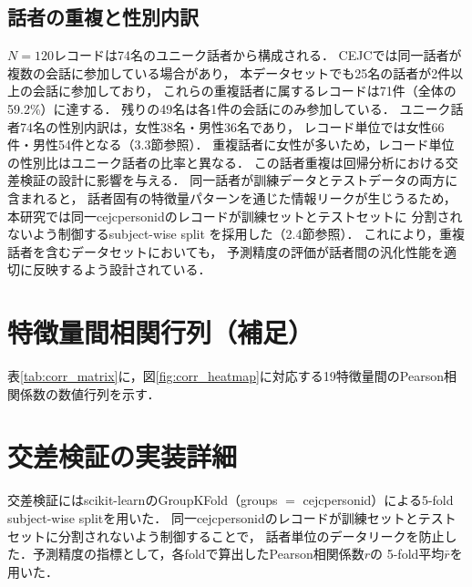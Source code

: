 \documentclass[dvipdfmx,11pt,a4paper]{bxjsarticle}
\renewcommand{\_}{\paperorigunderscore\allowbreak}%
\begin{document}
\subsection{話者の重複と性別内訳}
$N = 120$レコードは74名のユニーク話者から構成される．
CEJCでは同一話者が複数の会話に参加している場合があり，
本データセットでも25名の話者が2件以上の会話に参加しており，
これらの重複話者に属するレコードは71件（全体の59.2\%）に達する．
残りの49名は各1件の会話にのみ参加している．
ユニーク話者74名の性別内訳は，女性38名・男性36名であり，
レコード単位では女性66件・男性54件となる（3.3節参照）．
重複話者に女性が多いため，レコード単位の性別比はユニーク話者の比率と異なる．
この話者重複は回帰分析における交差検証の設計に影響を与える．
同一話者が訓練データとテストデータの両方に含まれると，
話者固有の特徴量パターンを通じた情報リークが生じうるため，
本研究では同一cejc\_person\_idのレコードが訓練セットとテストセットに
分割されないよう制御するsubject-wise split を採用した（2.4節参照）．
これにより，重複話者を含むデータセットにおいても，
予測精度の評価が話者間の汎化性能を適切に反映するよう設計されている．

\section{特徴量間相関行列（補足）}
\label{sec:supp_corr}
表\ref{tab:corr_matrix}に，図\ref{fig:corr_heatmap}に対応する19特徴量間のPearson相関係数の数値行列を示す．

\begin{table}[htbp]
\centering
\caption{19特徴量間のPearson相関行列．}
\label{tab:corr_matrix}

\end{table}

\section{交差検証の実装詳細}
\label{sec:appendix_cv}
交差検証にはscikit-learnのGroupKFold（groups $=$ cejc\_person\_id）による5-fold subject-wise splitを用いた．
同一cejc\_person\_idのレコードが訓練セットとテストセットに分割されないよう制御することで，
話者単位のデータリークを防止した．予測精度の指標として，各foldで算出したPearson相関係数$r$の
5-fold平均$\bar{r}$を用いた．
\end{document}
